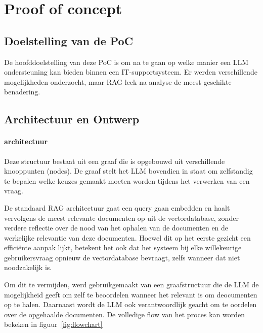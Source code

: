 \chapter{Proof of concept}
\label{ch:proof-of-concept}

\section{Doelstelling van de PoC}

De hoofddoelstelling van deze PoC is om na te gaan op welke manier een LLM ondersteuning kan bieden binnen een IT-supportsysteem. Er werden verschillende mogelijkheden onderzocht, maar RAG leek na analyse de meest geschikte benadering. 


\section{Architectuur en Ontwerp}


\subsubsection{architectuur}

Deze structuur bestaat uit een graaf die is opgebouwd uit verschillende knooppunten (nodes). De graaf stelt het LLM bovendien in staat om zelfstandig te bepalen welke keuzes gemaakt moeten worden tijdens het verwerken van een vraag.

De standaard RAG architectuur gaat een query gaan embedden en haalt vervolgens de meest relevante documenten op uit de vectordatabase, zonder verdere reflectie over de nood van het ophalen van de documenten en de werkelijke relevantie van deze documenten. Hoewel dit op het eerste gezicht een efficiënte aanpak lijkt, betekent het ook dat het systeem bij elke willekeurige gebruikersvraag opnieuw de vectordatabase bevraagt, zelfs wanneer dat niet noodzakelijk is.

Om dit te vermijden, werd gebruikgemaakt van een graafstructuur die de LLM de mogelijkheid geeft om zelf te beoordelen wanneer het relevant is om deocumenten op te halen. Daarnaast wordt de LLM ook verantwoordlijk geacht om te oordelen over de opgehaalde documenten. De volledige flow van het proces kan worden bekeken in figuur~\ref{fig:flowchart}


